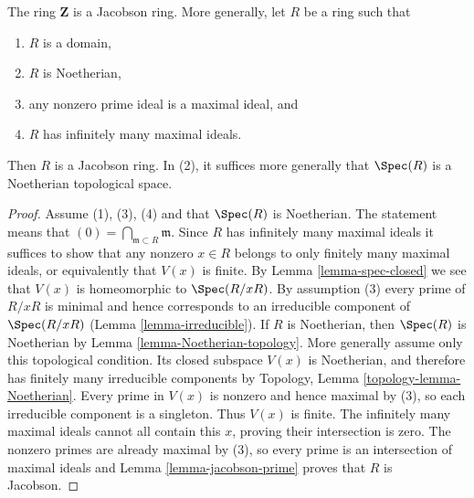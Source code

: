 \begin{lemma}
\label{lemma-pid-jacobson}
The ring $\mathbf{Z}$ is a Jacobson ring.
More generally, let $R$ be a ring such that
\begin{enumerate}
\item $R$ is a domain,
\item $R$ is Noetherian,
\item any nonzero prime ideal is a maximal ideal, and
\item $R$ has infinitely many maximal ideals.
\end{enumerate}
Then $R$ is a Jacobson ring. In (2), it suffices more generally
that $\Spec(R)$ is a Noetherian topological space.
\end{lemma}

\begin{proof}
Assume (1), (3), (4) and that $\Spec(R)$ is Noetherian. The statement
means that $(0) = \bigcap_{\mathfrak m \subset R} \mathfrak m$.
Since $R$ has infinitely many maximal ideals it suffices to
show that any nonzero $x\in R$ belongs to only finitely many
maximal ideals, or equivalently that $V(x)$ is finite.
By Lemma \ref{lemma-spec-closed}
we see that $V(x)$ is homeomorphic to $\Spec(R/xR)$.
By assumption (3) every prime of $R/xR$ is minimal and hence
corresponds to an irreducible component of $\Spec(R/xR)$
(Lemma \ref{lemma-irreducible}).
If $R$ is Noetherian, then $\Spec(R)$ is Noetherian by
Lemma \ref{lemma-Noetherian-topology}. More generally assume only
this topological condition. Its closed subspace $V(x)$ is Noetherian,
and therefore has finitely many irreducible components by Topology,
Lemma \ref{topology-lemma-Noetherian}. Every prime in $V(x)$ is
nonzero and hence maximal by (3), so each irreducible component is
a singleton. Thus $V(x)$ is finite. The infinitely many maximal
ideals cannot all contain this $x$, proving their intersection is zero.
The nonzero primes are already maximal by (3), so every prime is an
intersection of maximal ideals and Lemma \ref{lemma-jacobson-prime}
proves that $R$ is Jacobson.
\end{proof}
